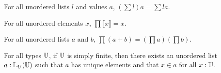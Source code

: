 \documentclass[../../math.tex]{subfiles}
\begin{document}
\begin{theorem} \label{ulist_sum_rmult}
    For all unordered lists $l$ and values $a$, $\left( \sum l \right) a = \sum
    la$.
\end{theorem}

\begin{theorem}
    For all unordered elements $x$, $\prod \llbracket x\rrbracket = x$.
\end{theorem}

\begin{theorem} \label{ulist_prod_conc}
    For all unordered lists $a$ and $b$, $\prod (a + b) = (\prod a) (\prod b)$.
\end{theorem}

\begin{theorem} \label{ulist_finite}
    For all types $\mathbb{U}$, if $\mathbb{U}$ is simply finite, then there exists an unordered
    list $a : \mathbb{L}_U(\mathbb{U})$ such that $a$ has unique elements and that $x \in a$ for
    all $x : \mathbb{U}$.
\end{theorem}
\end{document}
